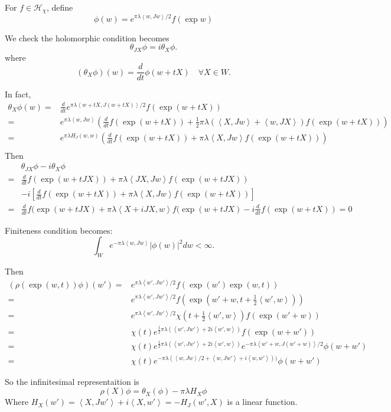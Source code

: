 \documentclass[12pt]{article}
\def\inn#1#2{\left\langle{#1},{#2}\right\rangle}
\def\abs#1{\left|{#1}\right|}
\def\chh{\mathcal{H}}
\def\ddt{\frac{d}{dt}}
\begin{document}
For $f\in \chh_\chi$, define
\[
\phi(w) = e^{\pi \lambda \inn{w}{Jw}/2} f(\exp w) 
\] 

We check the holomorphic condition becomes 
\[
\theta_{JX} \phi = i \theta_{X} \phi.
\]
where 
\[
(\theta_X \phi)(w) = \frac{d}{dt}\phi(w+tX) \quad \forall X\in W.
\]

In fact, 
\[
\begin{split}
\theta_X \phi(w) =& \ddt e^{\pi \lambda \inn{w+tX}{J(w+tX)}/2} f(\exp(w+tX))\\
= &  e^{\pi \lambda \inn{w}{Jw}}(\ddt f(\exp(w+tX)) 
+ \frac{1}{2}\pi\lambda (\inn{X}{Jw}+\inn{w}{JX}) f(\exp(w+tX))) \\
= &  e^{\pi \lambda H_J(w,w)}(\ddt f(\exp(w+tX)) + \pi\lambda \inn{X}{Jw} f(\exp(w+tX))) \\
\end{split}
\] 
Then 
\[
\begin{split}
&\theta_{JX}\phi - i\theta_{X}\phi \\
= & \ddt f(\exp(w+tJX)) + \pi\lambda \inn{JX}{Jw} f(\exp(w+tJX))\\
&-i \left[ \ddt f(\exp(w+tX)) + \pi\lambda \inn{X}{Jw} f(\exp(w+tX))\right]\\
=& \ddt f(\exp(w+tJX)  + \pi \lambda \inn{X+iJX}{w} f(\exp(w+tJX)
- i \ddt f(\exp(w+tX))= 0 
\end{split}
\]

Finiteness condition becomes:
\[
\int_W e^{-\pi \lambda \inn{w}{Jw}}\abs{\phi(w)}^2dw < \infty.
\]

Then
\[
\begin{split}
(\rho(\exp(w,t))\phi)(w') =& e^{\pi \lambda \inn{w'}{Jw'}/2} f(\exp(w') \exp(w,t))\\
=& e^{\pi \lambda \inn{w'}{Jw'}/2} f(\exp(w'+w,t+ \frac{1}{2}\inn{w'}{w}))\\
=& e^{\pi \lambda \inn{w'}{Jw'}/2} \chi(t+ \frac{1}{2}\inn{w'}{w}) f(\exp(w'+w))\\
=& \chi(t) e^{\frac{1}{2}\pi \lambda (\inn{w'}{Jw'}+2i \inn{w'}{w})}
 f(\exp(w+w')) \\
=& \chi(t) e^{\frac{1}{2}\pi \lambda (\inn{w'}{Jw'}+2i \inn{w'}{w})} 
e^{-\pi \lambda \inn{w'+w}{J(w'+w)}/2} \phi(w+w')\\
=& \chi(t) e^{-\pi \lambda (\inn{w}{Jw}/2+ \inn{w}{Jw'}+i\inn{w}{w'}))} 
 \phi(w+w') 
\end{split}
\]


So the infinitesimal representaition is 
\[
\rho(X) \phi = \theta_X(\phi) -\pi\lambda H_X \phi
\]
Where $H_X(w') =\inn{X}{Jw'} + i\inn{X}{w'} = -H_J(w',X)$ is a linear function.
\end{document}
